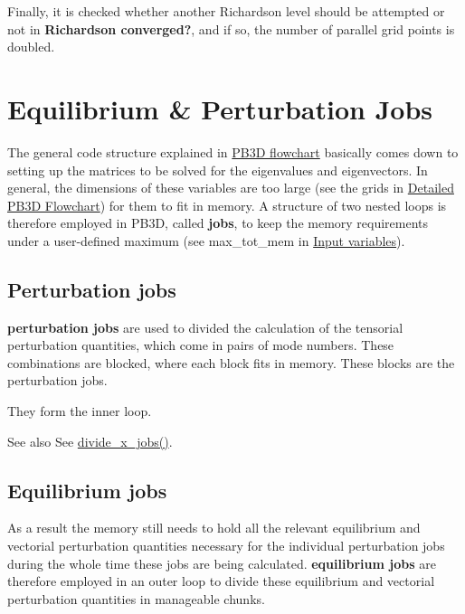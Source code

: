 Finally, it is checked whether another Richardson level should be attempted or not in {\bfseries Richardson converged?}, and if so, the number of parallel grid points is doubled.\hypertarget{page_overview_overview_jobs}{}\section{Equilibrium \& Perturbation Jobs}\label{page_overview_overview_jobs}
The general code structure explained in \hyperlink{page_overview_overview_PB3D_flowchart}{P\+B3D flowchart} basically comes down to setting up the matrices to be solved for the eigenvalues and eigenvectors. In general, the dimensions of these variables are too large (see the grids in \hyperlink{page_overview_detail_PB3D}{Detailed P\+B3D Flowchart}) for them to fit in memory. A structure of two nested loops is therefore employed in P\+B3D, called {\bfseries jobs}, to keep the memory requirements under a user-\/defined maximum (see {\ttfamily max\+\_\+tot\+\_\+mem} in \hyperlink{page_inputs}{Input variables}).\hypertarget{page_overview_overview_jobs_X}{}\subsection{Perturbation jobs}\label{page_overview_overview_jobs_X}
{\bfseries perturbation jobs} are used to divided the calculation of the tensorial perturbation quantities, which come in pairs of mode numbers. These combinations are blocked, where each block fits in memory. These blocks are the perturbation jobs.

They form the inner loop.

\begin{DoxySeeAlso}{See also}
See \hyperlink{namespacex__ops_a677c88d85fe1bfbf3579a2421ce16f2f}{divide\+\_\+x\+\_\+jobs()}.
\end{DoxySeeAlso}
\hypertarget{page_overview_overview_jobs_eq}{}\subsection{Equilibrium jobs}\label{page_overview_overview_jobs_eq}
As a result the memory still needs to hold all the relevant equilibrium and vectorial perturbation quantities necessary for the individual perturbation jobs during the whole time these jobs are being calculated. {\bfseries equilibrium jobs} are therefore employed in an outer loop to divide these equilibrium and vectorial perturbation quantities in manageable chunks.

